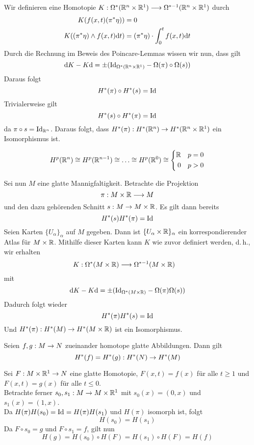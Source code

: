\Bem{}
Wir definieren eine Homotopie $K : \Omega^*(\mathbb{R}^n \times \mathbb{R}^1) \overset{}{\longrightarrow} \Omega^{* - 1}(\mathbb{R}^n \times \mathbb{R}^1)$ durch
\begin{align*}
K( f(x,t)(\pi^*\eta)) &= 0\\
K((\pi^*\eta) \wedge f(x,t) \text{d} t) &= (\pi^*\eta)\cdot \int_0^t f(x,t)\text{d} t
\end{align*}
Durch die Rechnung im Beweis des Poincare-Lemmas wissen wir nun, dass gilt
\[ \text{d} K - K \text{d} = \pm(\text{Id}_{\Omega^*(\mathbb{R}^n \times \mathbb{R}^1)} - \Omega(\pi) \circ \Omega(s)) \]
Daraus folgt
\[ H^*(\pi) \circ H^*(s) = \text{Id}_{} \]
Trivialerweise gilt
\[ H^*(s) \circ H^*(\pi) = \text{Id}_{} \]
da $\pi \circ s = \text{Id}_{\mathbb{R}^n}$. Daraus folgt, dass $H^*(\pi) : H^*(\mathbb{R}^n ) \overset{}{\rightarrow} H^*(\mathbb{R}^n\times \mathbb{R}^1)$ ein Isomorphismus ist.

\Kor{}
\[ H^p(\mathbb{R}^n) \overset{}{\cong} H^p(\mathbb{R}^{n-1}) \overset{}{\cong} \ldots \overset{}{\cong} H^p(\mathbb{R}^0) \overset{}{\cong} \left\lbrace 
\begin{aligned}
\mathbb{R} && p = 0\\
0 && p > 0
\end{aligned}
\right. \]


\Bem{}
Sei nun $M$ eine glatte Mannigfaltigkeit. Betrachte die Projektion
\[ \pi : M \times \mathbb{R} \overset{}{\longrightarrow} M \]
und den dazu gehörenden Schnitt $s : M \overset{}{\rightarrow} M\times \mathbb{R}$. Es gilt dann bereits
\[ H^*(s) H^*(\pi) = \text{Id}_{} \]
Seien Karten $\{U_\alpha\}_\alpha$ auf $M$ gegeben. Dann ist $\{U_\alpha \times \mathbb{R}\}_\alpha$ ein korrespondierender Atlas für $M\times \mathbb{R}$. Mithilfe dieser Karten kann $K$ wie zuvor definiert werden, d.\,h., wir erhalten
\begin{align*}
K : \Omega^*(M\times \mathbb{R}) & \overset{}{\longrightarrow} \Omega^{*-1}(M\times \mathbb{R})
\end{align*}
mit
\[ \text{d} K - K \text{d} = \pm (\text{Id}_{\Omega^*(M\times \mathbb{R})} - \Omega(\pi) \Omega(s)) \]
Dadurch folgt wieder
\[ H^*(\pi) H^*(s) = \text{Id}_{} \]
Und $H^*(\pi) : H^*(M) \overset{}{\rightarrow} H^*(M\times \mathbb{R})$ ist ein Isomorphismus.

Seien $f,g : M \overset{}{\rightarrow} N$ zueinander homotope glatte Abbildungen. Dann gilt
\[ H^*(f) = H^*(g) : H^*(N) \overset{}{\rightarrow} H^*(M) \]
\begin{Beweis}{}
Sei $F: M\times \mathbb{R}^1 \overset{}{\rightarrow} N$ eine glatte Homotopie, $F(x,t) = f(x)$ für alle $t\geq 1$ und $F(x,t)= g(x)$ für alle $t\leq 0$.\\
Betrachte ferner $s_0, s_1 : M \overset{}{\rightarrow} M \times \mathbb{R}^1$ mit $s_0(x) = (0,x)$ und $s_1(x) = (1,x)$.\\
Da $H(\pi) H(s_0) = \text{Id}_{} = H(\pi)H(s_1)$ und $H(\pi)$ isomorph ist, folgt
\[ H(s_0) = H(s_1) \]
Da $F\circ s_0 = g$ und $F\circ s_1 = f$, gilt nun
\[ H(g) = H(s_0) \circ H(F) = H(s_1) \circ H(F) = H(f) \]
\end{Beweis}